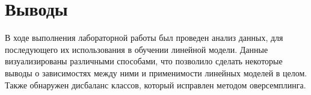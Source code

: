 \section{Выводы}

В ходе выполнения лабораторной работы был проведен анализ данных, для последующего их использования в обучении линейной модели. Данные визуализированы различными способами, что позволило сделать некоторые выводы о зависимостях между ними и применимости линейных моделей в целом. Также обнаружен дисбаланс классов, который исправлен методом оверсемплинга.
\pagebreak

